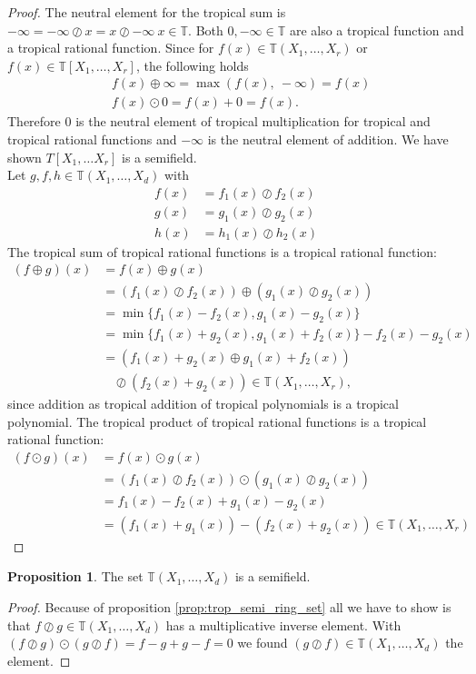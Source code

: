 \documentclass{article}
\theoremstyle{definition}
\newtheorem{proposition}[theorem]{Proposition}
\begin{document}
\begin{proof}
The neutral element for the tropical sum is $- \infty = - \infty \oslash x = x \oslash - \infty \ x \in \mathbb{T}$. Both $0, -\infty \in \mathbb{T}$ are also a tropical function and a tropical rational function. Since for $f(x) \in \mathbb{T}(X_1, \dots , X_r)$ or $f(x) \in \mathbb{T}[X_1, \dots , X_r]$, the following holds
\begin{align*}
&f(x) \oplus \infty = \max(f(x),\ - \infty) = f(x) \\
&f(x) \odot 0 = f(x) + 0 = f(x).
\end{align*} 
Therefore $0$ is the neutral element of tropical multiplication for tropical and tropical rational functions and $-\infty$ is the neutral element of addition. We have shown $T[X_1, \dots X_r]$ is a semifield. \\ 
Let $g,f,h \in \mathbb{T}(X_1, \dots ,X_d)$ with 
\begin{align*}
f(x) &= f_1(x) \oslash f_2(x) \\
g(x) &= g_1(x) \oslash g_2(x) \\
h(x) &= h_1(x) \oslash h_2(x)
\end{align*}
The tropical sum of tropical rational functions is a tropical rational function:
\begin{align*}
(f \oplus g)(x) &= f(x) \oplus g(x) \\
&=(f_1(x) \oslash f_2(x)) \oplus (g_1(x) \oslash g_2(x)) \\
&= \min\{f_1(x) - f_2(x), g_1(x) - g_2(x) \} \\
&= \min\{f_1(x) + g_2(x), g_1(x) + f_2(x) \} - f_2(x) - g_2(x) \\
&= (f_1(x) + g_2(x) \oplus g_1(x) + f_2(x)) \\
& \ \ \ \ \oslash (f_2(x) + g_2(x)) \in \mathbb{T}(X_1, \dots , X_r),
\end{align*}
since addition as tropical addition of tropical polynomials is a tropical polynomial.
The tropical product of tropical rational functions is a tropical rational function:
\begin{align*}
(f \odot g)(x) &= f(x) \odot g(x) \\
&=  (f_1(x) \oslash f_2(x)) \odot (g_1(x) \oslash g_2(x)) \\
&= f_1(x) - f_2(x) + g_1(x) - g_2(x) \\
&= (f_1(x) + g_1(x)) - (f_2(x) + g_2(x)) \in \mathbb{T}(X_1, \dots , X_r)
\end{align*}
\end{proof}

\begin{proposition}
The set $\mathbb{T}(X_1, \dots , X_d)$ is a semifield.
\end{proposition}
\begin{proof}
Because of proposition \ref{prop:trop_semi_ring_set} all we have to show is that $f \oslash g \in \mathbb{T}(X_1, \dots , X_d)$ has a multiplicative inverse element. With $(f \oslash g) \odot (g \oslash f) = f - g + g - f = 0$ we found $(g \oslash f) \in \mathbb{T}(X_1, \dots , X_d)$ the element.
\end{proof}
\end{document}
